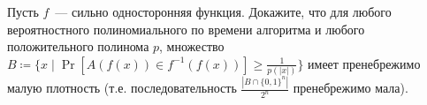 Пусть $f$~--- сильно односторонняя функция. Докажите, что для любого вероятностного полиномиального по
времени алгоритма и любого положительного полинома $p$, множество $B \coloneqq \{x \mid \Pr[A(f(x)) \in
f^{-1}(f(x))] \ge \frac{1}{p(|x|)} \}$ имеет пренебрежимо малую плотность (т.е. последовательность
$\frac{|B \cap \{0, 1\}^n|}{2^n}$ пренебрежимо мала).